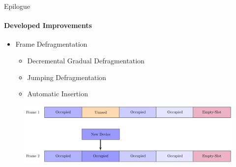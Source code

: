                     \begin{frame}[t]{Epilogue}\framesubtitle{Developed Improvements}
                    \begin{itemize}
                        \item<1-4> Frame Defragmentation
                            \begin{itemize}
                                \item<1,2> Decremental Gradual Defragmentation
                                \item<1,3> Jumping Defragmentation
                                \item<1,4> Automatic Insertion
                            \end{itemize}
                    \end{itemize}
                    \begin{figure}
                        \includegraphics[width=1\textwidth]{images/aiut.pdf}
                    \end{figure}
        \end{frame}


